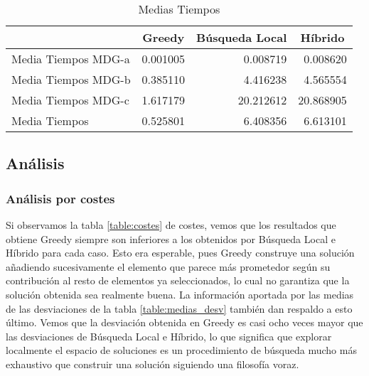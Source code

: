 \documentclass[10pt,a4paper]{article}
\begin{document}
\begin{table}[]
\centering
\begin{tabular}{l|r|r|r|}
	\cline{2-4}
	\multicolumn{1}{c|}{\textbf{}}            & \multicolumn{1}{c|}{\textbf{Greedy}} & \multicolumn{1}{c|}{\textbf{Búsqueda Local}} & \multicolumn{1}{c|}{\textbf{Híbrido}} \\ \hline
	\multicolumn{1}{|l|}{Media Tiempos MDG-a} & 0.001005                             & 0.008719                                     & 0.008620                              \\ \hline
	\multicolumn{1}{|l|}{Media Tiempos MDG-b} & 0.385110                             & 4.416238                                     & 4.565554                              \\ \hline
	\multicolumn{1}{|l|}{Media Tiempos MDG-c} & 1.617179                             & 20.212612                                    & 20.868905                             \\ \hline
	\multicolumn{1}{|l|}{Media Tiempos}       & 0.525801                             & 6.408356                                     & 6.613101                              \\ \hline
\end{tabular}
\caption{Medias Tiempos}
\label{table:medias_tiempos}
\end{table}




\subsection{Análisis}

\subsubsection{Análisis por costes}

Si observamos la tabla \ref{table:costes} de costes, vemos que los resultados que obtiene Greedy siempre son inferiores a los obtenidos por Búsqueda Local e Híbrido para cada caso. Esto era esperable, pues Greedy construye una solución añadiendo sucesivamente el elemento que parece más prometedor según su contribución al resto de elementos ya seleccionados, lo cual no garantiza que la solución obtenida sea realmente buena. La información aportada por las medias de las desviaciones de la tabla \ref{table:medias_desv} también dan respaldo a esto último. Vemos que la desviación obtenida en Greedy es casi ocho veces mayor que las desviaciones de Búsqueda Local e Híbrido, lo que significa que explorar localmente el espacio de soluciones es un procedimiento de búsqueda mucho más exhaustivo que construir una solución siguiendo una filosofía voraz.
\end{document}
